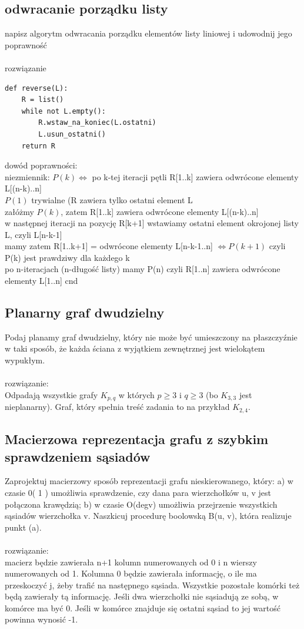\documentclass{article}
\begin{document}
\subsection*{odwracanie porządku listy}
napisz algorytm odwracania porządku elementów listy liniowej i udowodnij jego poprawność \\\\
rozwiązanie \\
\begin{lstlisting}
def reverse(L):
	R = list()
	while not L.empty():
		R.wstaw_na_koniec(L.ostatni)
		L.usun_ostatni()
	return R
\end{lstlisting}
dowód poprawności: \\
niezmiennik: $P(k) \iff $  po k-tej iteracji pętli R[1..k] zawiera odwrócone elementy L[(n-k)..n] \\
$P(1)$ trywialne (R zawiera tylko ostatni element L \\
załóżmy $P(k)$, zatem R[1..k] zawiera odwrócone elementy L[(n-k)..n] \\
w następnej iteracji na pozycję R[k+1] wstawiamy ostatni element okrojonej listy L, czyli L[n-k-1] \\
mamy zatem R[1..k+1] = odwrócone elementy L[n-k-1..n] $\iff P(k+1)$ czyli P(k) jest prawdziwy dla każdego k \\
po n-iteracjach (n-długość listy) mamy P(n) czyli R[1..n] zawiera odwrócone elementy L[1..n] cnd

\subsection*{Planarny graf dwudzielny}
Podaj planamy graf dwudzielny, który nie może być umieszczony na płaszczyźnie w taki sposób, że każda ściana z wyjątkiem zewnętrznej jest wielokątem wypukłym. \\\\rozwiązanie:\\
Odpadają wszystkie grafy $K_{p,q}$ w których $p\geq 3$ i $q \geq 3$ (bo $K_{3,3}$ jest nieplanarny). Graf, który spełnia treść zadania to na przykład $K_{2,4}$.

\subsection*{Macierzowa reprezentacja grafu z szybkim sprawdzeniem sąsiadów}
Zaprojektuj macierzowy sposób reprezentacji grafu nieskierowanego, który:
a) w czasie 0( 1 ) umożliwia sprawdzenie, czy dana para wierzchołków u, v jest połączona krawędzią;
b) w czasie O(degv) umożliwia przejrzenie wszystkich sąsiadów wierzchołka v. Naszkicuj
procedurę boolowską B(u, v), która realizuje punkt (a). \\\\rozwiązanie:\\
macierz będzie zawierała n+1 kolumn numerowanych od 0 i n wierszy numerowanych od 1.
Kolumna 0 będzie zawierała informację,  o ile ma przeskoczyć j, żeby trafić na następnego sąsiada. 
Wszystkie pozostałe komórki też będą zawierały tą informację.  Jeśli dwa wierzchołki nie sąsiadują ze sobą,  w komórce ma być 0. 
Jeśli w komórce znajduje się ostatni sąsiad to jej wartość powinna wynosić -1. 
\end{document}

